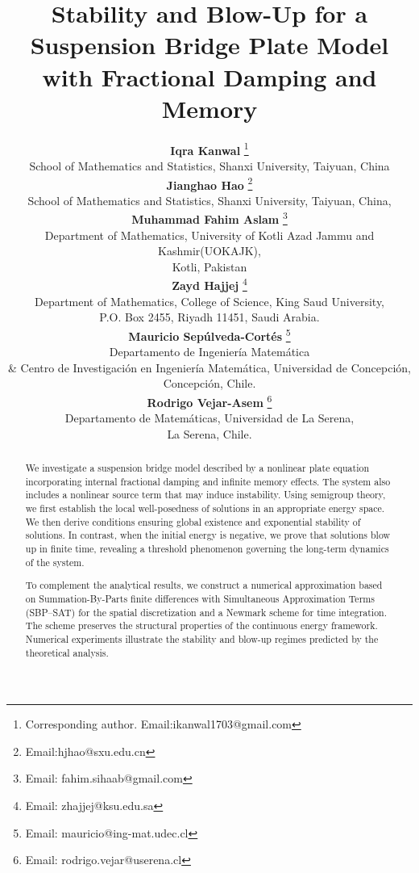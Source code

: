 \documentclass[12pt]{article}
\numberwithin{equation}{section}
\begin{document}
\title{\bf Stability and Blow-Up for a Suspension Bridge Plate Model with Fractional Damping and Memory}
	\author{
		\small{\bf Iqra Kanwal}
        \footnote{Corresponding author. Email:ikanwal1703@gmail.com} \\
		\small School of Mathematics and Statistics, Shanxi University, Taiyuan, China \\
		\small {\bf Jianghao Hao}  \footnote{ Email:hjhao@sxu.edu.cn }\\
		\small School of Mathematics and Statistics, Shanxi University, Taiyuan, China,\\
		\small{\bf Muhammad Fahim Aslam}
        \footnote {Email: fahim.sihaab@gmail.com}\\
		\small Department of Mathematics, University of Kotli Azad Jammu and Kashmir(UOKAJK), \\ \small Kotli, Pakistan  \\
        \small{\bf Zayd Hajjej} \footnote{Email: zhajjej@ksu.edu.sa}\\
        \small Department of Mathematics, College of Science, King Saud University,\\
        \small P.O. Box 2455, Riyadh 11451, Saudi Arabia. \\
        \small{\bf Mauricio Sep\'ulveda-Cort\'es} \footnote{Email: mauricio@ing-mat.udec.cl}\\
        \small Departamento de Ingenier\'ia Matem\'atica \\ \small \& Centro de Investigaci\'on en Ingenier\'ia Matem\'atica, Universidad de Concepci\'on,\\
        \small Concepci\'on, Chile. \\
        \small{\bf Rodrigo Vejar-Asem} \footnote{Email: rodrigo.vejar@userena.cl}\\
        \small Departamento de Matem\'aticas, Universidad de La Serena,\\
        \small La Serena, Chile.
        }
	\date{}
	\maketitle
	\begin{abstract}
We investigate a suspension bridge model described by a nonlinear plate equation
incorporating internal fractional damping and infinite memory effects. The system
also includes a nonlinear source term that may induce instability. Using semigroup
theory, we first establish the local well-posedness of solutions in an appropriate
energy space. We then derive conditions ensuring global existence and exponential
stability of solutions. In contrast, when the initial energy is negative, we prove
that solutions blow up in finite time, revealing a threshold phenomenon governing
the long-term dynamics of the system.

To complement the analytical results, we construct a numerical approximation based
on Summation-By-Parts finite differences with Simultaneous Approximation Terms
(SBP--SAT) for the spatial discretization and a Newmark scheme for time integration.
The scheme preserves the structural properties of the continuous energy framework.
Numerical experiments illustrate the stability and blow-up regimes predicted by
the theoretical analysis.
\end{abstract}
\end{document}
